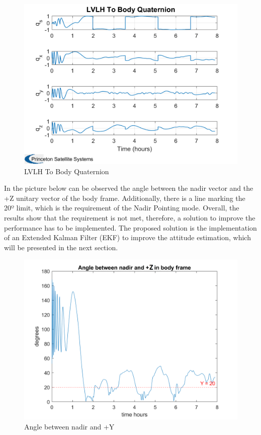 \begin{itemize}
    \begin{figure}[H]
        \centering
        \includegraphics[width=0.7\linewidth]{res/img/Nadir_no_EKF/LVLH To Body Quaternion.png}
        \caption{LVLH To Body Quaternion}
        \label{fig:LVLHToBodyQuaternion}
    \end{figure}

\end{itemize}

\noindent In the picture below can be observed the angle between the nadir vector and the +Z unitary vector of the body frame. 
Additionally, there is a line marking the 20º limit, which is the requirement of the Nadir Pointing mode. 
Overall, the results show that the requirement is not met, therefore, a solution to improve the performance has to be implemented.
The proposed solution is the implementation of an Extended Kalman Filter (EKF) to improve the attitude estimation, which will be presented in the next section.

\begin{figure}[H]
    \centering
    \includegraphics[width=0.7\linewidth]{res/img/Nadir_no_EKF/Angle between nadir and +Y.png}
    \caption{Angle between nadir and +Y}
    \label{fig:AngleNadirY}
\end{figure}

